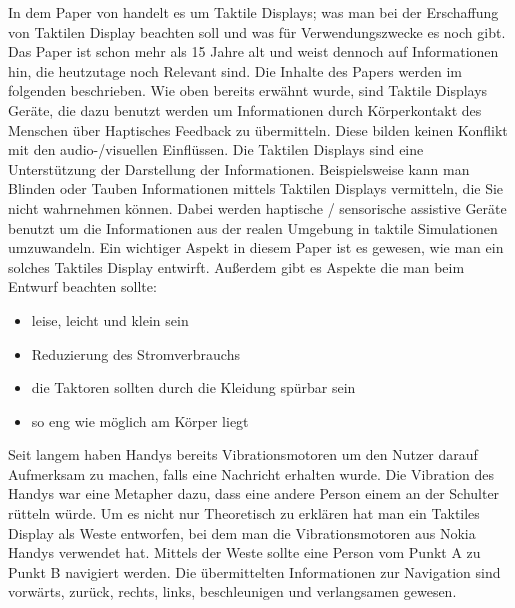 
In dem Paper von \cite{gemperle2001design} handelt es um Taktile Displays; 
was man bei der Erschaffung von Taktilen Display beachten soll und was f{\"u}r Verwendungszwecke es noch gibt. 
Das Paper ist schon mehr als 15 Jahre alt und weist dennoch auf Informationen hin, die heutzutage noch Relevant sind. 
Die Inhalte des Papers werden im folgenden beschrieben.
Wie oben bereits erw{\"a}hnt wurde, sind Taktile Displays Ger{\"a}te, die dazu benutzt werden um Informationen durch K{\"o}rperkontakt des Menschen {\"u}ber Haptisches Feedback zu {\"u}bermitteln. Diese bilden keinen Konflikt mit den audio-/visuellen Einfl{\"u}ssen. 
Die Taktilen Displays sind eine Unterst{\"u}tzung der Darstellung der Informationen. 
Beispielsweise kann man Blinden oder Tauben Informationen mittels Taktilen Displays vermitteln, die Sie nicht wahrnehmen k{\"o}nnen.
Dabei werden haptische / sensorische assistive Ger{\"a}te benutzt um die Informationen aus der realen Umgebung in taktile Simulationen umzuwandeln.
Ein wichtiger Aspekt in diesem Paper ist es gewesen, wie man ein solches Taktiles Display entwirft.
Au{\ss}erdem gibt es Aspekte die man beim Entwurf beachten sollte:
\begin{itemize}
\item leise, leicht und klein sein
\item Reduzierung des Stromverbrauchs
\item die Taktoren sollten durch die Kleidung sp{\"u}rbar sein
\item so eng wie m{\"o}glich am K{\"o}rper liegt
\end{itemize}
Seit langem haben Handys bereits Vibrationsmotoren um den Nutzer darauf Aufmerksam zu machen, falls eine Nachricht erhalten wurde.
Die Vibration des Handys war eine Metapher dazu, dass eine andere Person einem an der Schulter r{\"u}tteln w{\"u}rde. \cite{gemperle2001design} 
Um es nicht nur Theoretisch zu erkl{\"a}ren hat man ein Taktiles Display als Weste entworfen, bei dem man die Vibrationsmotoren aus Nokia Handys verwendet hat. Mittels der Weste sollte eine Person vom Punkt A zu Punkt B navigiert werden. 
Die {\"u}bermittelten Informationen zur Navigation sind vorw{\"a}rts, zur{\"u}ck, rechts, links, beschleunigen und verlangsamen gewesen. 